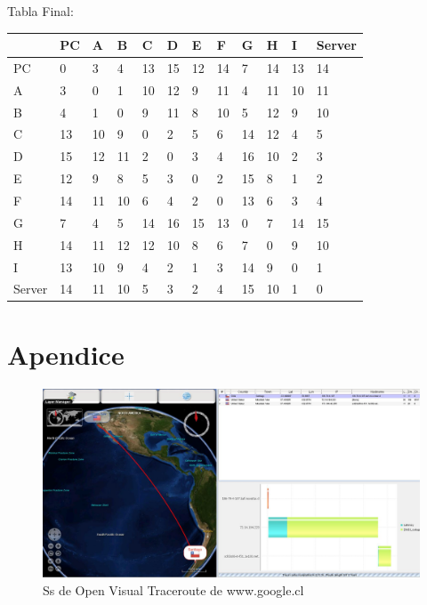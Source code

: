\documentclass[a4paper]{article}
\begin{document}
\begin{table}[h]
Tabla Final:\\
\begin{tabular}{|l|l|l|l|l|l|l|l|l|l|l|l|}
\hline
       & PC & A  & B  & C  & D  & E  & F  & G  & H  & I  & Server \\ \hline
PC     & 0  & 3  & 4  & 13 & 15 & 12 & 14 & 7  & 14 & 13 & 14     \\ \hline
A      & 3  & 0  & 1  & 10 & 12 & 9  & 11 & 4  & 11 & 10 & 11     \\ \hline
B      & 4  & 1  & 0  & 9  & 11 & 8  & 10 & 5  & 12 & 9  & 10     \\ \hline
C      & 13 & 10 & 9  & 0  & 2  & 5  & 6  & 14 & 12 & 4  & 5      \\ \hline
D      & 15 & 12 & 11 & 2  & 0  & 3  & 4  & 16 & 10 & 2  & 3      \\ \hline
E      & 12 & 9  & 8  & 5  & 3  & 0  & 2  & 15 & 8  & 1  & 2      \\ \hline
F      & 14 & 11 & 10 & 6  & 4  & 2  & 0  & 13 & 6  & 3  & 4      \\ \hline
G      & 7  & 4  & 5  & 14 & 16 & 15 & 13 & 0  & 7  & 14 & 15     \\ \hline
H      & 14 & 11 & 12 & 12 & 10 & 8  & 6  & 7  & 0  & 9  & 10     \\ \hline
I      & 13 & 10 & 9  & 4  & 2  & 1  & 3  & 14 & 9  & 0  & 1      \\ \hline
Server & 14 & 11 & 10 & 5  & 3  & 2  & 4  & 15 & 10 & 1  & 0      \\ \hline
\end{tabular}
\end{table}
\clearpage

\section{Apendice}
\clearpage
\begin{figure}
\centering
\includegraphics[width=1\textwidth]{google-cl.JPG}
\caption{\label{fig:google}Ss de Open Visual Traceroute de www.google.cl}
\end{figure}
\end{document}
